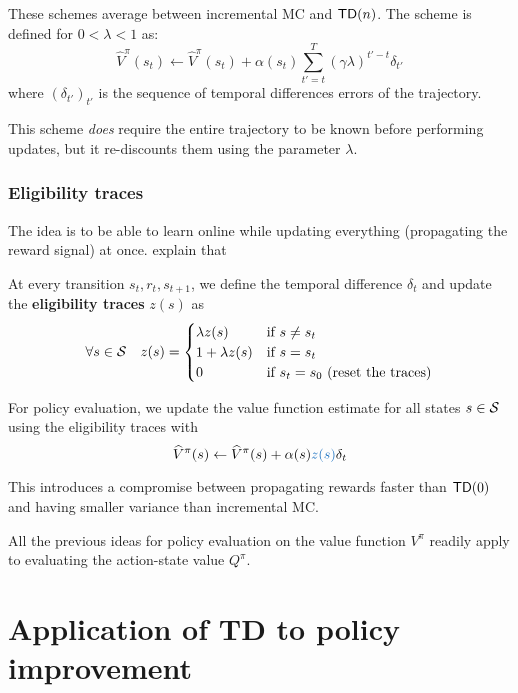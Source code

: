 \documentclass[../course-notes.tex]{subfiles}
\begin{document}
These schemes average between incremental MC and $\mathsf{TD}(n)$. The scheme is defined for $0 < \lambda < 1$ as:
\begin{equation}
	\widehat{V}^\pi(s_t) \leftarrow \widehat{V}^\pi(s_t) + \alpha(s_t) \sum_{t'=t}^T (\gamma\lambda)^{t'-t}\delta_{t'}
\end{equation}
where ${(\delta_{t'})}_{t'}$ is the sequence of temporal differences errors of the trajectory.


This scheme \textit{does} require the entire trajectory to be known before performing updates, but it re-discounts them using the parameter $\lambda$.


\subsubsection{Eligibility traces}

The idea is to be able to learn online while updating everything (propagating the reward signal) at once. \textcite{Sutton1998} explain that 

At every transition $s_t,r_t,s_{t+1}$, we define the temporal difference $\delta_t$ and update the \textbf{\bluefont eligibility traces} {\bluefont $z(s)$} as
\[
	\forall s\in\mathcal{S} \quad 
	z(s) = \begin{cases}
	\lambda z(s) &\text{if }s\neq s_t \\
	1 + \lambda z(s)& \text{if }s=s_t \\
	0& \text{if } s_t = s_0 \text{ (reset the traces)}
	\end{cases}
\]

For policy evaluation, we update the value function estimate for all states $s\in\mathcal{S}$ using the eligibility traces with
\begin{equation}
	\widehat{V}^\pi(s) \leftarrow
	\widehat{V}^\pi(s) + \alpha(s){\bluefont z(s)}\delta_t
\end{equation}



This introduces a compromise between propagating rewards faster than $\mathsf{TD}(0)$ and having smaller variance than incremental MC.


\begin{remark}
	All the previous ideas for policy evaluation on the value function $V^\pi$ readily apply to evaluating the action-state value $Q^\pi$.
\end{remark}



\section{Application of TD to policy improvement}
\end{document}
